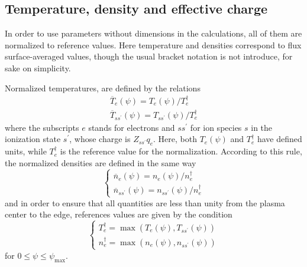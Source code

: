                       

\label{normalization}

\subsection{Temperature, density and effective charge}

\label{normtene}

In order to use parameters without dimensions in the calculations, all of
them are normalized to reference values. Here temperature and densities
correspond to flux surface-averaged values, though the usual bracket
notation is not introduce, for sake on simplicity.

Normalized temperatures, are defined by the relations 
\begin{equation}
\begin{array}{l}
\overline{T}_{e}\left( \psi \right) =T_{e}\left( \psi \right) /T_{e}^{\dag }
\\ 
\overline{T}_{ss^{\prime }}\left( \psi \right) =T_{ss^{\prime }}\left( \psi
\right) /T_{e}^{\dag }%
\end{array}%
\end{equation}%
where the subscripts $e$ stands for electrons and $ss^{\prime }$ for ion
species $s$ in the ionization state $s^{\prime }$, whose charge is $%
Z_{ss^{\prime }}q_{e}$. Here, both $T_{e}\left( \psi \right) $ and $%
T_{e}^{\dag }$ have defined units, while $T_{e}^{\dag }$ is the reference
value for the normalization. According to this rule, the normalized
densities are defined in the same way 
\begin{equation}
\left\{ 
\begin{array}{l}
\overline{n}_{e}\left( \psi \right) =n_{e}\left( \psi \right) /n_{e}^{\dag }
\\ 
\overline{n}_{ss^{\prime }}\left( \psi \right) =n_{ss^{\prime }}\left( \psi
\right) /n_{e}^{\dag }%
\end{array}%
\right. 
\end{equation}%
and in order to ensure that all quantities are less than unity from the
plasma center to the edge, references values are given by the condition 
\begin{equation}
\left\{ 
\begin{array}{l}
T_{e}^{\dag }=\max \left( T_{e}\left( \psi \right) ,T_{ss^{\prime }}\left(
\psi \right) \right)  \\ 
n_{e}^{\dag }=\max \left( n_{e}\left( \psi \right) ,n_{ss^{\prime }}\left(
\psi \right) \right) 
\end{array}%
\right. 
\end{equation}%
for $0\leq \psi \leq \psi _{\max }.$

